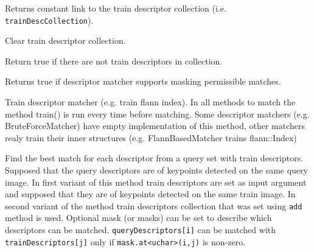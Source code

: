 
\begin{description}
\end{description}

Returns constant link to the train descriptor collection (i.e. \texttt{trainDescCollection}).


Clear train descriptor collection.


Return true if there are not train descriptors in collection.


Returns true if descriptor matcher supports masking permissible matches.


Train descriptor matcher (e.g. train flann index).  In all methods to match the method train() 
is run every time before matching. Some descriptor matchers (e.g. BruteForceMatcher) have empty 
implementation of this method, other matchers realy train their inner structures (e.g. FlannBasedMatcher 
trains flann::Index)

    
Find the best match for each descriptor from a query set with train descriptors.
Supposed that the query descriptors are of keypoints detected on the same query image. 
In first variant of this method train descriptors are set as input argument and 
supposed that they are of keypoints detected on the same train image. In second variant 
of the method train descriptors collection that was set using \texttt{add} method is used.
Optional mask (or masks) can be set to describe which descriptors can be matched. 
\texttt{queryDescriptors[i]} can be matched with \texttt{trainDescriptors[j]} only if 
\texttt{mask.at<uchar>(i,j)} is non-zero.

